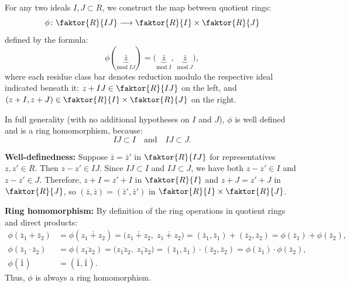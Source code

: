 \begin{content}
For any two ideals $I, J \subset R$, we construct the map between quotient rings:
\begin{equation}\label{eq:crt-canonical-map}
\phi \colon \faktor{R}{IJ} \longrightarrow \faktor{R}{I} \times \faktor{R}{J}
\end{equation}
defined by the formula:
\begin{equation}\label{eq:crt-phi-rule}
\phi(\underbrace{\bar{z}}_{\text{mod}\; IJ}) = \bigl(\underbrace{\bar{z}}_{\text{mod}\; I},\; \underbrace{\bar{z}}_{\text{mod}\; J}\bigr),
\end{equation}
where each residue class bar denotes reduction modulo the respective ideal indicated beneath it: $z + IJ \in \faktor{R}{IJ}$ on the left, and $(z + I, z + J) \in \faktor{R}{I} \times \faktor{R}{J}$ on the right.

In full generality (with no additional hypotheses on $I$ and $J$), $\phi$ is well defined and is a ring homomorphism, because:
\[
IJ \subset I \quad \text{and} \quad IJ \subset J.
\]

\begin{steps}
\textbf{Well-definedness:} Suppose $\bar{z} = \bar{z}'$ in $\faktor{R}{IJ}$ for representatives $z, z' \in R$. Then $z - z' \in IJ$. Since $IJ \subset I$ and $IJ \subset J$, we have both $z - z' \in I$ and $z - z' \in J$. Therefore, $z + I = z' + I$ in $\faktor{R}{I}$ and $z + J = z' + J$ in $\faktor{R}{J}$, so $(\bar{z}, \bar{z}) = (\bar{z}', \bar{z}')$ in $\faktor{R}{I} \times \faktor{R}{J}$.

\textbf{Ring homomorphism:} By definition of the ring operations in quotient rings and direct products:
\begin{align*}
\phi(\bar{z}_1 + \bar{z}_2) &= \phi(\overline{z_1 + z_2}) = \bigl(\overline{z_1 + z_2},\; \overline{z_1 + z_2}\bigr) = (\bar{z}_1, \bar{z}_1) + (\bar{z}_2, \bar{z}_2) = \phi(\bar{z}_1) + \phi(\bar{z}_2), \\
\phi(\bar{z}_1 \cdot \bar{z}_2) &= \phi(\overline{z_1 z_2}) = \bigl(\overline{z_1 z_2},\; \overline{z_1 z_2}\bigr) = (\bar{z}_1, \bar{z}_1) \cdot (\bar{z}_2, \bar{z}_2) = \phi(\bar{z}_1) \cdot \phi(\bar{z}_2), \\
\phi(\bar{1}) &= (\bar{1}, \bar{1}).
\end{align*}
Thus, $\phi$ is always a ring homomorphism.
\end{steps}
\end{content}

